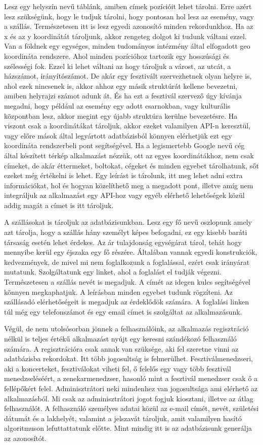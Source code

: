 \documentclass[11pt]{article}
\begin{document}
Lesz egy helyszín nevű táblánk, amiben címek pozícióit lehet tárolni. Erre azért lesz szükségünk, hogy le tudjuk tárolni, hogy pontosan hol lesz az esemény, vagy a szállás. Természetesen itt is lesz egyedi azonosító minden rekordunkhoz. Ha az x és az y koordinátát tároljunk, akkor rengeteg dolgot ki tudunk váltani ezzel. Van a földnek egy egységes, minden tudományos intézmény által elfogadott geo koordináta rendszere. Ahol minden pozícióhoz tartozik egy hosszúsági és szélességi fok. Ezzel ki lehet váltani az hogy tároljuk a várost, az utcát, a házszámot, irányítószámot. De akár egy fesztivált szervezhetnek olyan helyre is, ahol ezek nincsenek is, akkor ahhoz egy másik struktúrát kellene bevezetni, amiben helyrajzi számot adunk át. És ha ezt a fesztivál szervező úgy kívánja megadni, hogy például az esemény egy adott csarnokban, vagy kulturális központban lesz, akkor megint egy újabb struktúra kerülne bevezetésre. Ha viszont csak a koordinátákat tároljuk, akkor ezeket valamilyen API-n keresztül, vagy előre mások által legyártott adatbázisból könnyen elérhetjük ezt egy koordináta rendszerbeli pont segítségével. Ha a legismertebb Google nevű cég által készített térkép alkalmazást nézzük, ott az egyes koordinátákhoz, nem csak címeket, de akár éttermeket, boltokat, cégeket és minden egyebet tárolhatunk, sőt ezeket még értékelni is lehet. Egy leírást is tárolunk, itt meg lehet adni extra információkat, hol és hogyan közelíthető meg a megadott pont, illetve amíg nem integráljuk az alkalmazást egy API-hoz vagy egyéb elérhető lehetőségek közül addig magát a címet is itt tároljuk.

A szállásokat is tároljuk az adatbázisunkban. Lesz egy fő nevű oszlopunk amely azt tárolja, hogy a szállás hány személyt képes befogadni, ez egy kisebb baráti társaság esetén lehet érdekes. Az ár tulajdonság egységárat tárol, tehát hogy mennyibe kerül egy éjszaka egy fő részére. Általában vannak egyedi konstrukciók, kedvezmények, de mivel mi nem foglalkozunk a foglalással, ezért csak irányárat mutatunk. Szolgáltatunk egy linket, ahol a foglalást el tudják végezni. Természetesen a szállás nevét is megadjuk. A címét az idegen kulcs segítségével könnyen megkaphatjuk. A leírásban minden egyebet tudunk rögzíteni. Az szállásadó elérhetőségeit is megadjuk az érdeklődök számára. A foglalási linken túl még egy telefonszámot és egy email címet is szolgáltat az alkalmazásunk.

Végül, de nem utolsósorban jönnek a felhasználóink, az alkalmazás regisztráció nélkül is teljes értékű alkalmazást nyújt egy keresni szándékozó felhasználó számára. A regisztrációra csak annak van szüksége, aki fel szeretne vinni az adatbázisba rekordokat. Itt több jogosultság is  felmerülhet. Fesztiválmenedzseri, aki a koncerteket, fesztiválokat viheti fel, ő felelős egy vagy több fesztivál menedzseléséért, a zenekarmenedzser, hasonló mint a fesztivál menedzser csak ő a fellépőkért felel. Adminisztrátori neki mindenhez van jogosultsága ami elérhető az alkalmazásból. Mi csak az adminisztrátori jogot fogjuk kiosztani, illetve az átlag felhasználót. A felhasználó személyes adatai közül az e-mail címét, nevét, születési dátumát és a lakhelyét, valamint a jelszavát tároljuk, amit valamilyen hasító algoritmuson lefuttattatunk előtte. Mint mindig itt is az adatbázisunk generálja az azonosítót.
\end{document}
